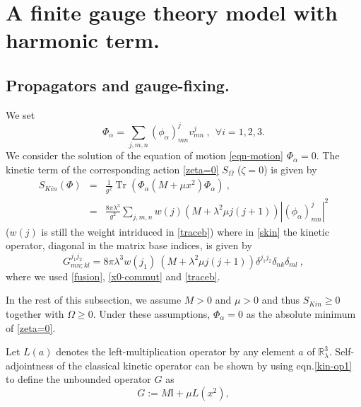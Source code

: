 \documentclass[a4paper,11pt,twoside]{article}
\numberwithin{equation}{section}
\newcommand\bbone{{ \mathbb{I}}}
\DeclareMathOperator{\tr}{Tr}
\theoremstyle{nonumberplain}
\newcounter{and}
\begin{document}

\section{A finite gauge theory model with harmonic term.}\label{section3}

\subsection{Propagators and gauge-fixing.}\label{subsection31}

We set%
%
\begin{equation}
\Phi_\alpha = \sum_{j,m,n} (\phi_\alpha)^j_{mn} v^j_{mn} \ , \ \ \forall i=1,2,3.
\end{equation}
%
We consider the solution of the equation of motion \eqref{eqn-motion} $\Phi_\alpha=0$. The kinetic term of the corresponding action \eqref{zeta=0} $S_\Omega$ ($\zeta=0$) is given by%
%
\begin{eqnarray}
S_{Kin}(\Phi) &=& \frac{1}{g^2} \tr\left( \Phi_\alpha \left(M+\mu x^2\right) \Phi_\alpha \right) \ , \label{skin} \\
&=& \frac{8\pi\lambda^3}{g^2} \sum_{j,m,n} w(j) \left(M+\lambda^2\mu j(j+1)\right) |(\phi_\alpha)^j_{mn}|^2 \label{skin-explicit}
\end{eqnarray}
%
($w(j)$ is still the weight intriduced in \eqref{traceb}) where in \eqref{skin} the kinetic operator, diagonal in the matrix base indices, is given by%
%
\begin{equation}
G^{j_1j_2}_{mn;kl} = 8\pi\lambda^3 w(j_1) \ \left(M+\lambda^2\mu j(j+1)\right) \delta^{j_1j_2} \delta_{nk} \delta_{ml} \ , \label{kin-op1}
\end{equation}
%
where we used \eqref{fusion}, \eqref{x0-commut} and \eqref{traceb}.\par%
%
In the rest of this subsection, we assume $M>0$ and $\mu>0$ and thus $S_{Kin}\ge0$ together with $\Omega\ge0$. Under these assumptions, $\Phi_\alpha=0$ as the absolute minimum of \eqref{zeta=0}.\par%
%
Let $L(a)$ denotes the left-multiplication operator by any element $a$ of $\mathbb{R}^3_\lambda$. Self-adjointness of the classical kinetic operator can be shown by using eqn.\eqref{kin-op1} to define the unbounded operator $G$ as%
%
\begin{equation}
G:= M \bbone + \mu L(x^2) \label{kinet-harmonic},
\end{equation}
\end{document}
